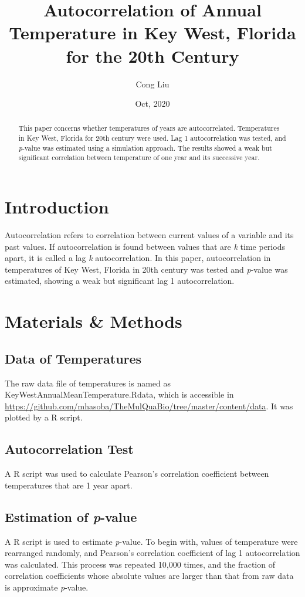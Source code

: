 \documentclass[12pt]{paper}
\title{Autocorrelation of Annual Temperature in Key West, Florida for the 20th Century}
\author{Cong Liu}
\date{Oct, 2020}
\begin{document}
  \maketitle
  \tableofcontents
  \begin{abstract}
    This paper concerns whether temperatures of years are autocorrelated. Temperatures
    in Key West, Florida for 20th century were used. Lag 1 autocorrelation was tested, and 
    \textit{p}-value was estimated using a simulation approach. The results showed a weak but significant
    correlation between temperature of one year and its successive year. 
    
  \end{abstract}
  
  \section{Introduction}
  Autocorrelation refers to correlation between current values of a variable and its past values.
  If autocorrelation is found between values that are \textit{k} time periods apart, it is called
  a lag \textit{k} autocorrelation. In this paper, autocorrelation in temperatures of Key West, 
  Florida in 20th century was tested and \textit{p}-value was estimated, showing a weak but significant
  lag 1 autocorrelation.
  
  \section{Materials \& Methods}
   
    \subsection{Data of Temperatures}
    The raw data file of temperatures is named as KeyWestAnnualMeanTemperature.Rdata, 
    which is accessible in 
    \newline
    \href{https://github.com/mhasoba/TheMulQuaBio/tree/master/content/data}{https://github.com/mhasoba/TheMulQuaBio/tree/master/content/data}.
    It was plotted by a R script.
    
    \subsection{Autocorrelation Test}
    A R script was used to calculate Pearson's correlation coefficient between temperatures that
    are 1 year apart.
    
    \subsection{Estimation of \textit{p}-value}
    A R script is used to estimate \textit{p}-value. To begin with, values of temperature were
    rearranged randomly, and Pearson's correlation coefficient of lag 1 autocorrelation was calculated.
    This process was repeated 10,000 times, and the fraction of correlation coefficients whose absolute 
    values are larger than that from raw data is approximate \textit{p}-value.
  
\end{document}
